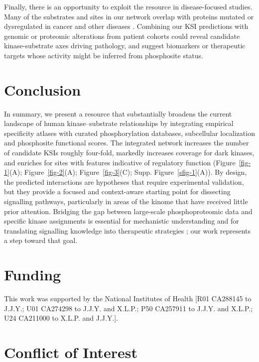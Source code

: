 \documentclass[
  number,
  preprint,
  onecolumn]{elsarticle}
\begin{document}
Finally, there is an opportunity to exploit the resource in
disease-focused studies. Many of the substrates and sites in our network
overlap with proteins mutated or dysregulated in cancer and other
diseases
\citep{Hornbeck2015-dg, Ochoa2020-og, Invergo2020-kl, Johnson2023-ai, Obenauer2003-fc}.
Combining our KSI predictions with genomic or proteomic alterations from
patient cohorts could reveal candidate kinase-substrate axes driving
pathology, and suggest biomarkers or therapeutic targets whose activity
might be inferred from phosphosite status.

\section{Conclusion}\label{conclusion}

In summary, we present a resource that substantially broadens the
current landscape of human kinase--substrate relationships by
integrating empirical specificity atlases with curated phosphorylation
databases, subcellular localization and phosphosite functional scores.
The integrated network increases the number of candidate KSIs roughly
four-fold, markedly increases coverage for dark kinases, and enriches
for sites with features indicative of regulatory function
(Figure~\ref{fig-1}(A); Figure~\ref{fig-2}(A); Figure~\ref{fig-3}(C);
Supp. Figure~\ref{sfig-1}(A)). By design, the predicted interactions are
hypotheses that require experimental validation, but they provide a
focused and context-aware starting point for dissecting signalling
pathways, particularly in areas of the kinome that have received little
prior attention. Bridging the gap between large-scale phosphoproteomic
data and specific kinase assignments is essential for mechanistic
understanding and for translating signalling knowledge into therapeutic
strategies
\citep{Hornbeck2019-psp, Chen2025-bt, Ochoa2020-og, Wang2020-hj, Sekar2024-nx};
our work represents a step toward that goal.

\section{Funding}\label{funding}

This work was supported by the National Institutes of Health {[}R01
CA288145 to J.J.Y.; U01 CA274298 to J.J.Y. and X.L.P.; P50 CA257911 to
J.J.Y. and X.L.P.; U24 CA211000 to X.L.P. and J.J.Y.{]}.

\section{Conflict of Interest}\label{conflict-of-interest}
\end{document}
